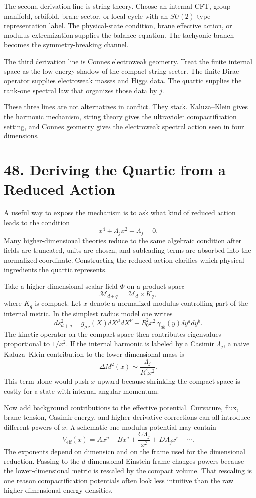 \documentclass[11pt]{article}
\newcommand{\Lspin}{\Lambda_j}
\begin{document}
The second derivation line is string theory. Choose an internal CFT, group manifold, orbifold, brane sector, or local cycle with an \(SU(2)\)-type representation label. The physical-state condition, brane effective action, or modulus extremization supplies the balance equation. The tachyonic branch becomes the symmetry-breaking channel.

The third derivation line is Connes electroweak geometry. Treat the finite internal space as the low-energy shadow of the compact string sector. The finite Dirac operator supplies electroweak masses and Higgs data. The quartic supplies the rank-one spectral law that organizes those data by \(j\).

These three lines are not alternatives in conflict. They stack. Kaluza--Klein gives the harmonic mechanism, string theory gives the ultraviolet compactification setting, and Connes geometry gives the electroweak spectral action seen in four dimensions.


\section*{48. Deriving the Quartic from a Reduced Action}

A useful way to expose the mechanism is to ask what kind of reduced action leads to the condition
\[
        x^4+\Lspin x^2-\Lspin=0 .
\]
Many higher-dimensional theories reduce to the same algebraic condition after fields are truncated, units are chosen, and subleading terms are absorbed into the normalized coordinate. Constructing the reduced action clarifies which physical ingredients the quartic represents.

Take a higher-dimensional scalar field \(\Phi\) on a product space
\[
        \mathcal{M}_{d+q}=\mathcal{M}_d\times K_q ,
\]
where \(K_q\) is compact. Let \(x\) denote a normalized modulus controlling part of the internal metric. In the simplest radius model one writes
\[
        ds^2_{d+q}=g_{\mu\nu}(X)dX^\mu dX^\nu
        +R_0^2x^2\,\gamma_{ab}(y)dy^ady^b .
\]
The kinetic operator on the compact space then contributes eigenvalues proportional to \(1/x^2\). If the internal harmonic is labeled by a Casimir \(\Lspin\), a naive Kaluza--Klein contribution to the lower-dimensional mass is
\[
        \Delta M^2(x)\sim \frac{\Lspin}{R_0^2x^2}.
\]
This term alone would push \(x\) upward because shrinking the compact space is costly for a state with internal angular momentum.

Now add background contributions to the effective potential. Curvature, flux, brane tension, Casimir energy, and higher-derivative corrections can all introduce different powers of \(x\). A schematic one-modulus potential may contain
\[
        V_{\text{eff}}(x)
        =
        A x^p+B x^q+\frac{C\Lspin}{x^2}
        +D\Lspin x^r+\cdots .
\]
The exponents depend on dimension and on the frame used for the dimensional reduction. Passing to the \(d\)-dimensional Einstein frame changes powers because the lower-dimensional metric is rescaled by the compact volume. That rescaling is one reason compactification potentials often look less intuitive than the raw higher-dimensional energy densities.
\end{document}
